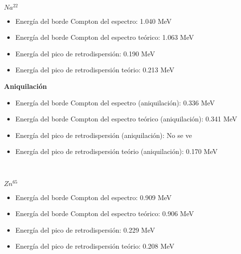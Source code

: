 \documentclass[11pt]{article}
\begin{document}
    \begin{center}
    \end{center}
    { \hspace*{\fill} \\}
    
    \(Na^{22}\)

\begin{itemize}
\item
  Energía del borde Compton del espectro: 1.040 MeV
\item
  Energía del borde Compton del espectro teórico: 1.063 MeV
\item
  Energía del pico de retrodispersión: 0.190 MeV
\item
  Energía del pico de retrodispersión teório: 0.213 MeV
\end{itemize}

\textbf{Aniquilación}

\begin{itemize}
\item
  Energía del borde Compton del espectro (aniquilación): 0.336 MeV
\item
  Energía del borde Compton del espectro teórico (aniquilación): 0.341
  MeV
\item
  Energía del pico de retrodispersión (aniquilación): No se ve
\item
  Energía del pico de retrodispersión teório (aniquilación): 0.170 MeV
\end{itemize}

    \begin{center}
    \end{center}
    { \hspace*{\fill} \\}
    
    \(Zn^{65}\)

\begin{itemize}
\item
  Energía del borde Compton del espectro: 0.909 MeV
\item
  Energía del borde Compton del espectro teórico: 0.906 MeV
\item
  Energía del pico de retrodispersión: 0.229 MeV
\item
  Energía del pico de retrodispersión teório: 0.208 MeV
\end{itemize}
\end{document}
